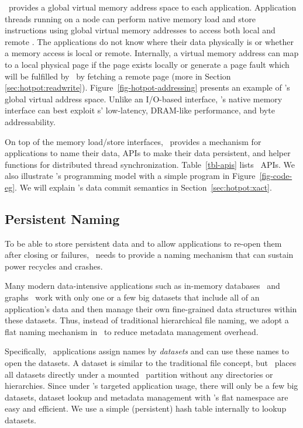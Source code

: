 \hotpot\ provides a global virtual memory address space to each application.
Application threads running on a node can perform native memory load and store instructions using global virtual memory addresses 
to access both local and remote \nvm.
The applications do not know where their data physically is or whether a memory access is local or remote.
Internally, a virtual memory address can map to a local physical page if the page exists locally or 
generate a page fault which will be fulfilled by \hotpot\ by fetching a remote page (more in Section \ref{sec:hotpot:readwrite}). 
Figure~\ref{fig-hotpot-addressing} presents an example of \hotpot's global virtual address space.
Unlike an I/O-based interface, \hotpot's native memory interface can best exploit \nvm{}s' low-latency, DRAM-like performance, and byte addressability.

On top of the memory load/store interfaces, \hotpot\ provides a mechanism for applications to 
name their data,
APIs to make their data persistent, %
and helper functions for distributed thread synchronization. 
Table~\ref{tbl-apis} lists \hotpot\ APIs.
We also illustrate \hotpot's programming model with a simple program in Figure~\ref{fig-code-eg}.
We will explain \hotpot's data commit semantics in Section~\ref{sec:hotpot:xact}.




\subsection{Persistent Naming}
\label{sec:hopot:naming}
To be able to store persistent data and to allow applications to re-open them after closing or failures, 
\hotpot\ needs to provide a naming mechanism that can sustain power recycles and crashes. 

Many modern data-intensive applications such as in-memory databases~\cite{MongoDB} and graphs~\cite{Gonzalez14-OSDI,Gonzalez12-OSDI}
work with only one or a few big datasets that include all of an application's data 
and then manage their own fine-grained data structures within these datasets.
Thus, instead of traditional hierarchical file naming, 
we adopt a flat naming mechanism in \hotpot\ to reduce metadata management overhead. %

Specifically, \hotpot\ applications assign names by {\em datasets}
and can use these names to open the datasets.
A dataset is similar to the traditional file concept, 
but \hotpot\ places all datasets directly under a mounted \hotpot\ partition without any directories or hierarchies.
Since under \hotpot's targeted application usage, there will only be a few big datasets,
dataset lookup and metadata management with \hotpot's flat namespace are easy and efficient.
We use a simple (persistent) hash table internally to lookup datasets. 

